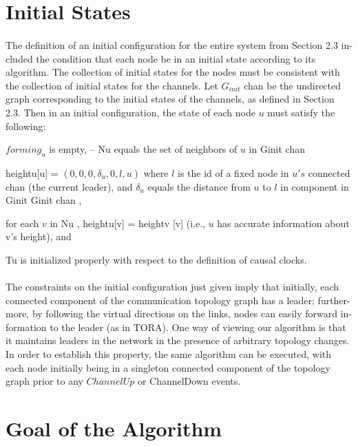 \section{Initial States}
\paragraph{}The definition of an initial configuration for the entire system from Section 2.3 in- cluded the condition that each node be in an initial state according to its algorithm. The collection of initial states for the nodes must be consistent with the collection of initial states for the channels. Let $G_{init}$ chan be the undirected graph corresponding to the initial states of the channels, as defined in Section 2.3. Then in an initial configuration, the state of each node $u$ must satisfy the following:
\begin{list}{--}{spacing}
	\item $forming_u$ is empty, – Nu equals the set of neighbors of $u$ in Ginit chan
	\item heightu[u] = $(0, 0, 0, \delta _u , 0, l, u)$ where $l$ is the id of a fixed node in $u's$ connected chan (the current leader), and $\delta _u$ equals the distance from $u$ to $l$ in component in Ginit Ginit chan ,
	\item for each $v$ in Nu , heightu[v] = heightv [v] (i.e., $u$ has accurate information about v’s height), and
	\item Tu is initialized properly with respect to the definition of causal clocks.
\end{list}
\paragraph{}The constraints on the initial configuration just given imply that initially, each connected component of the communication topology graph has a leader; further- more, by following the virtual directions on the links, nodes can easily forward in- formation to the leader (as in TORA). One way of viewing our algorithm is that it maintains leaders in the network in the presence of arbitrary topology changes. In order to establish this property, the same algorithm can be executed, with each node initially being in a singleton connected component of the topology graph prior to any $ChannelUp$ or ChannelDown events.
\section{Goal of the Algorithm}
